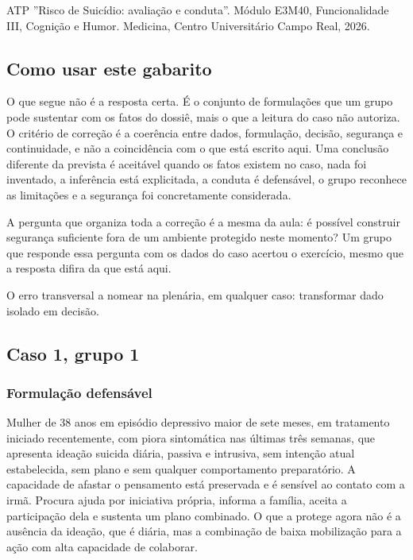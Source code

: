 ATP ''Risco de Suicídio: avaliação e conduta''. Módulo E3M40, Funcionalidade III, Cognição e Humor. Medicina, Centro Universitário Campo Real, 2026.

\subsection*{Como usar este gabarito}

O que segue não é a resposta certa. É o conjunto de formulações que um grupo pode sustentar com os fatos do dossiê, mais o que a leitura do caso não autoriza. O critério de correção é a coerência entre dados, formulação, decisão, segurança e continuidade, e não a coincidência com o que está escrito aqui. Uma conclusão diferente da prevista é aceitável quando os fatos existem no caso, nada foi inventado, a inferência está explicitada, a conduta é defensável, o grupo reconhece as limitações e a segurança foi concretamente considerada.

A pergunta que organiza toda a correção é a mesma da aula: é possível construir segurança suficiente fora de um ambiente protegido neste momento? Um grupo que responde essa pergunta com os dados do caso acertou o exercício, mesmo que a resposta difira da que está aqui.

O erro transversal a nomear na plenária, em qualquer caso: transformar dado isolado em decisão.

\filete

\subsection*{Caso 1, grupo 1}

\subsubsection*{Formulação defensável}

Mulher de 38 anos em episódio depressivo maior de sete meses, em tratamento iniciado recentemente, com piora sintomática nas últimas três semanas, que apresenta ideação suicida diária, passiva e intrusiva, sem intenção atual estabelecida, sem plano e sem qualquer comportamento preparatório. A capacidade de afastar o pensamento está preservada e é sensível ao contato com a irmã. Procura ajuda por iniciativa própria, informa a família, aceita a participação dela e sustenta um plano combinado. O que a protege agora não é a ausência da ideação, que é diária, mas a combinação de baixa mobilização para a ação com alta capacidade de colaborar.

